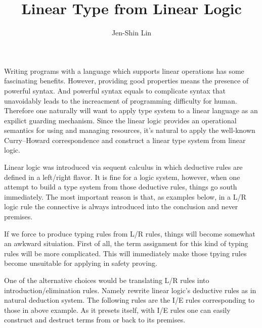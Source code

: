 \documentclass[a4paper,twocolumn]{article}
\title{Linear Type from Linear Logic}
\author{Jen-Shin Lin}
\begin{document}
\maketitle

Writing programs with a language which supports linear operations has some fascinating benefits. However, providing good properties means the presence of powerful syntax. And powerful syntax equals to complicate syntax that unavoidably leads to the increacment of programming difficulty for human. Therefore one naturally will want to apply type system to a linear language as an expilict guarding mechanism. Since the linear logic provides an operational semantics \cite{Girard95} for using and managing resources, it's natural to apply the well-known Curry–Howard correspondence and construct a linear type system from linear logic.

Linear logic was introduced via sequent calculus \cite{Girard87, Girard95} in which deductive rules are defined in a left/right flavor. It is fine for a logic system, however, when one attempt to build a type system from those deductive rules, things go south immediately. The most important reason is that, as examples below, in a L/R logic rule the connective is always introduced into the conclusion and never premises.

\begin{prooftree}
\end{prooftree}
\begin{prooftree}
\end{prooftree}

If we force to produce typing rules from L/R rules, things will become somewhat an awkward situiation. First of all, the term assignment for this kind of typing rules will be more complicated. This will immediately make those tpying rules become unsuitable for applying in safety proving.

One of the alternative choices would be translating L/R rules into introduction/elimination rules. Namely rewrite linear logic's deductive rules as in natural deduction system. The following rules are the I/E rules corresponding to those in above example. As it presets itself, with I/E rules one can easily construct and destruct terms from or back to its premises.
\end{document}
